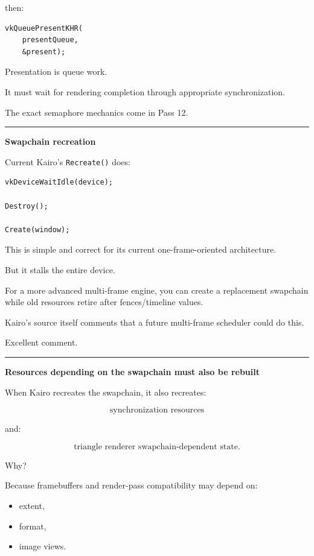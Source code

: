 then:

\begin{verbatim}
vkQueuePresentKHR(
    presentQueue,
    &present);
\end{verbatim}

Presentation is queue work.

It must wait for rendering completion through appropriate synchronization.

The exact semaphore mechanics come in Pass 12.

\begin{center}\rule{0.5\linewidth}{0.5pt}\end{center}

\textbf{Swapchain recreation}

Current Kairo's \texttt{Recreate()} does:

\begin{verbatim}
vkDeviceWaitIdle(device);

Destroy();

Create(window);
\end{verbatim}

This is simple and correct for its current one-frame-oriented architecture.

But it stalls the entire device.

For a more advanced multi-frame engine, you can create a replacement swapchain while old resources retire after fences/timeline values.

Kairo's source itself comments that a future multi-frame scheduler could do this.

Excellent comment.

\begin{center}\rule{0.5\linewidth}{0.5pt}\end{center}

\textbf{Resources depending on the swapchain must also be rebuilt}

When Kairo recreates the swapchain, it also recreates:

\[
\text{synchronization resources}
\]

and:

\[
\text{triangle renderer swapchain-dependent state}.
\]

Why?

Because framebuffers and render-pass compatibility may depend on:

\begin{itemize}
\tightlist
\item
  extent,
\item
  format,
\item
  image views.
\end{itemize}

